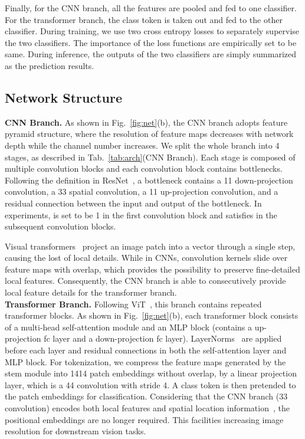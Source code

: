 \documentclass[10pt,twocolumn,letterpaper]{article}
\begin{document}
Finally, for the CNN branch, all the features are pooled and fed to one classifier. For the transformer branch, the class token is taken out and fed to the other classifier. During training, we use two cross entropy losses to separately supervise the two classifiers. The importance of the loss functions are empirically set to be same. During inference, the outputs of the two classifiers are simply summarized as the prediction results.

\subsection{Network Structure}\label{ssec:structure}


\noindent\textbf{CNN Branch.} 
As shown in Fig.~\ref{fig:net}(b), the CNN branch adopts feature pyramid structure, where the resolution of feature maps decreases with network depth while the channel number increases. We split the whole branch into 4 stages, as described in Tab.~\ref{tab:arch}(CNN Branch). Each stage is composed of multiple convolution blocks and each convolution block contains  bottlenecks. Following the definition in ResNet~\cite{ResNet2016}, a bottleneck contains a 11 down-projection convolution, a 33 spatial convolution, a 11 up-projection convolution, and a residual connection between the input and output of the bottleneck. In experiments,  is set to be 1 in the first convolution block and satisfies  in the subsequent  convolution blocks.

Visual transformers~\cite{ViT2020,DeiT2020} project  an image patch into a vector through a single step, causing the lost of local details. While in CNNs, convolution kernels slide over feature maps with overlap, which provides the possibility to preserve fine-detailed local features. Consequently, the CNN branch is able to consecutively provide local feature details for the transformer branch.
~\\


\noindent\textbf{Transformer Branch.}
Following ViT~\cite{ViT2020}, this branch contains  repeated transformer blocks. As shown in Fig.~\ref{fig:net}(b), each transformer block consists of a multi-head self-attention module and an MLP block (contains a up-projection fc layer and a down-projection fc layer). LayerNorms~\cite{LN2016} are applied before each layer and residual connections in both the self-attention layer and MLP block. For tokenization, we compress the feature maps generated by the stem module into 1414 patch embeddings without overlap, by a linear projection layer, which is a 44 convolution with stride 4. A class token is then pretended to the patch embeddings for classification. Considering that the CNN branch (33 convolution) encodes both local features and  spatial location information~\cite{Position2021}, the positional embeddings are no longer required. This facilities increasing image resolution for downstream vision tasks.
~\\
\end{document}
